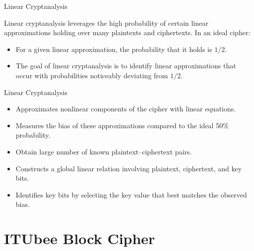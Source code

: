\documentclass{beamer}
\begin{document}
\begin{frame}{Linear Cryptanalysis}

Linear cryptanalysis leverages the high probability of certain linear approximations holding over many plaintexts and ciphertexts. In an ideal cipher:
\begin{itemize}
    \item For a given linear approximation, the probability that it holds is $1/2$.
    \item The goal of linear cryptanalysis is to identify linear approximations that occur with probabilities noticeably deviating from $1/2$.
\end{itemize}

\end{frame}
\begin{frame}{Linear Cryptanalysis}

\begin{itemize}
    \item Approximates nonlinear components of the cipher with linear equations.
    \item Measures the bias of these approximations compared to the ideal 50\% probability.
    \item Obtain large number of known plaintext--ciphertext pairs.
    \item Constructs a global linear relation involving plaintext, ciphertext, and key bits.
    \item Identifies key bits by selecting the key value that best matches the observed bias.
\end{itemize}
    
\end{frame}

\section{ITUbee Block Cipher}
\end{document}
